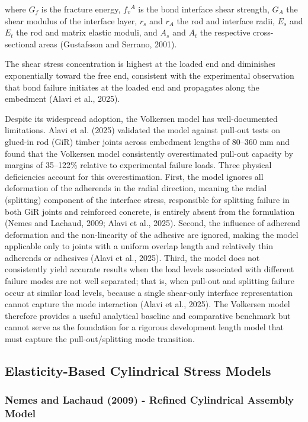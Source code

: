 where $G_{f}$ is the fracture energy, ${f_{v}}^{A}$ is the bond interface shear strength, $G_{A}$ the shear modulus of the interface layer, $r_{s}$ and $r_{A}$ the rod and interface radii, $E_{s}$ and $E_{t}$ the rod and matrix elastic moduli, and $A_{s}$ and $A_{t}$ the respective cross-sectional areas (Gustafsson and Serrano, 2001). 

The shear stress concentration is highest at the loaded end and diminishes exponentially toward the free end, consistent with the experimental observation that bond failure initiates at the loaded end and propagates along the embedment (Alavi et al., 2025).

Despite its widespread adoption, the Volkersen model has well-documented limitations. Alavi et al. (2025) validated the model against pull-out tests on glued-in rod (GiR) timber joints across embedment lengths of 80–360 mm and found that the Volkersen model consistently overestimated pull-out capacity by margins of 35–122\% relative to experimental failure loads. Three physical deficiencies account for this overestimation. First, the model ignores all deformation of the adherends in the radial direction, meaning the radial (splitting) component of the interface stress, responsible for splitting failure in both GiR joints and reinforced concrete, is entirely absent from the formulation (Nemes and Lachaud, 2009; Alavi et al., 2025). Second, the influence of adherend deformation and the non-linearity of the adhesive are ignored, making the model applicable only to joints with a uniform overlap length and relatively thin adherends or adhesives (Alavi et al., 2025). Third, the model does not consistently yield accurate results when the load levels associated with different failure modes are not well separated; that is, when pull-out and splitting failure occur at similar load levels, because a single shear-only interface representation cannot capture the mode interaction (Alavi et al., 2025). The Volkersen model therefore provides a useful analytical baseline and comparative benchmark but cannot serve as the foundation for a rigorous development length model that must capture the pull-out/splitting mode transition.

\subsection{Elasticity-Based Cylindrical Stress Models}
\subsubsection{Nemes and Lachaud (2009) - Refined Cylindrical Assembly Model}

